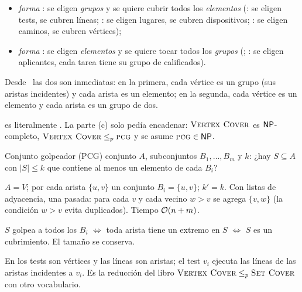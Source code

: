 \begin{itemize}
  \item \emph{forma \npSC}: se eligen \emph{grupos} y se quiere cubrir todos los \emph{elementos} (: se eligen tests, se cubren líneas; : se eligen lugares, se cubren dispositivos; : se eligen caminos, se cubren vértices);
  \item \emph{forma }: se eligen \emph{elementos} y se quiere tocar todos los \emph{grupos} (; : se eligen aplicantes, cada tarea tiene su grupo de calificados).
\end{itemize}

Desde \npVC\ las dos son inmediatas: en la primera, cada vértice es un grupo (sus aristas incidentes) y cada arista es un elemento; en la segunda, cada vértice es un elemento y cada arista es un grupo de dos.

 es literalmente . La parte (c) solo pedía encadenar: $\textsc{Vertex Cover}$ es $\mathsf{NP}$-completo, $\textsc{Vertex Cover}\le_{p}\textsc{pcg}$ y se asume $\textsc{pcg}\in\mathsf{NP}$.

\begin{problema}{Conjunto golpeador (PCG)}
 conjunto $A$, subconjuntos $B_1,\dots,B_m$ y $k$: ¿hay $S\subseteq A$ con $|S|\le k$ que contiene al menos un elemento de cada $B_i$?

 $A=V$; por cada arista $\{u,v\}$ un conjunto $B_i=\{u,v\}$; $k'=k$. Con listas de adyacencia, una pasada: para cada $v$ y cada vecino $w>v$ se agrega $\{v,w\}$ (la condición $w>v$ evita duplicados). Tiempo $\mathcal{O}(n+m)$.

 $S$ golpea a todos los $B_i$ $\iff$ toda arista tiene un extremo en $S$ $\iff$ $S$ es un cubrimiento. El tamaño se conserva.
\end{problema}

En  los tests son vértices y las líneas son aristas; el test $v_i$ ejecuta las líneas de las aristas incidentes a $v_i$. Es la reducción del libro $\textsc{Vertex Cover}\le_{p}\textsc{Set Cover}$ con otro vocabulario.

